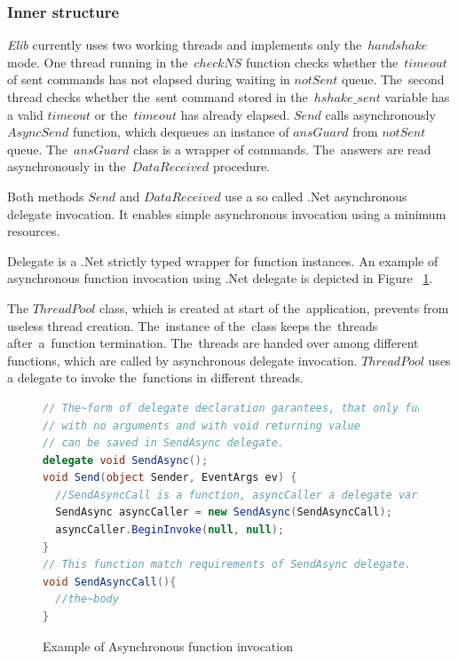   \subsubsection*{Inner structure} %
  {\it Elib} currently uses two working threads and implements only the~$handshake$ mode.
  One thread running in the~$checkNS$ function checks whether the~$timeout$ of sent commands
  has not elapsed during waiting in $notSent$ queue. The~second thread checks whether the~sent command
  stored in the~$hshake\_sent$ variable has a valid $timeout$ or the~$timeout$ has already elapsed.
  $Send$ calls asynchronously $AsyncSend$ function, which dequeues an instance of $ansGuard$ from $notSent$ queue.
  The~$ansGuard$ class is a wrapper of commands.
  The~answers are read asynchronously in the~$DataReceived$ procedure.
  \begin{remark}
  Both methods $Send$ and $DataReceived$ use a so called .Net asynchronous
  delegate invocation. It enables simple asynchronous invocation using a minimum resources.
  \end{remark}
  \begin{definition}[Delegate]
  Delegate\cite{delegate} is a .Net strictly typed wrapper for function instances.
  An example of asynchronous function invocation using .Net delegate is depicted in Figure ~\ref{invocation}.
  \end{definition}
  \begin{remark}
  The $ThreadPool$ class, which is created at 
  start of the~application, prevents from useless thread creation. 
  The~instance of the~class keeps the~threads after~a~function termination.
  The~threads are handed over among different functions, which are called 
  by asynchronous delegate invocation.
  $ThreadPool$ uses a delegate to invoke the~functions in different threads.
  \end{remark}
  
\begin{figure}[!hbp]
\begin{lstlisting}[language=cs]
// The~form of delegate declaration garantees, that only functions
// with no arguments and with void returning value 
// can be saved in SendAsync delegate.
delegate void SendAsync();
void Send(object Sender, EventArgs ev) {
  //SendAsyncCall is a function, asyncCaller a delegate variable
  SendAsync asyncCaller = new SendAsync(SendAsyncCall);
  asyncCaller.BeginInvoke(null, null);      
}
// This function match requirements of SendAsync delegate.
void SendAsyncCall(){
  //the~body
}
\end{lstlisting}
\caption{Example of Asynchronous function invocation}\label{invocation}
\end{figure}

